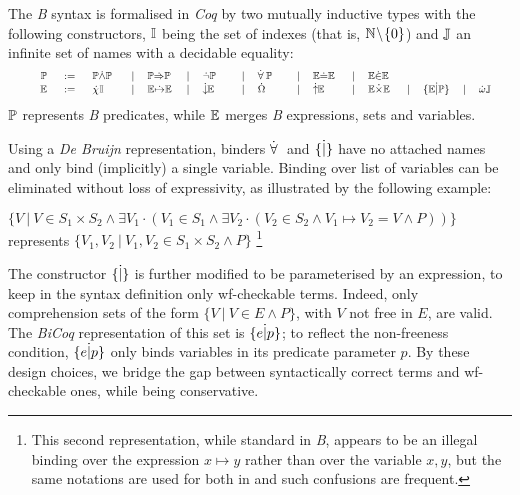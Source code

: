 \documentclass{llncs}
\begin{document}
The \emph{B} syntax is formalised in \emph{Coq} by two mutually inductive types with the 
following constructors, $\mathbb{I}$ being the set of indexes (that is, 
$\mathbb{N}\!\setminus\!\{\text{0}\}$) and $\mathbb{J}$ an infinite set of names with a decidable 
equality:
\[
\small
\begin{array}{rclclclclclclclcl}
\rule{1.0cm}{0cm} &
\rule{0.7cm}{0cm} & \rule{0.8cm}{0cm} &
\rule{0.2cm}{0cm} & \rule{0.8cm}{0cm} &
\rule{0.2cm}{0cm} & \rule{0.8cm}{0cm} &
\rule{0.2cm}{0cm} & \rule{0.8cm}{0cm} &
\rule{0.2cm}{0cm} & \rule{0.8cm}{0cm} &
\rule{0.2cm}{0cm} & \rule{0.8cm}{0cm} &
\rule{0.2cm}{0cm} & \rule{0.8cm}{0cm} &
\rule{0.2cm}{0cm} & \rule{0.8cm}{0cm} \vspace{-12pt} \\
\Bprd &:=& \Bprd \pand \Bprd &|& \Bprd \pimp \Bprd &|& \pnot \Bprd &|& \pfor \Bprd
        &|& \Bexp \pequ \Bexp &|& \Bexp \pins \Bexp
\\
\Bexp &:=& \evar{}\Bidx &|& \Bexp \ecpl \Bexp &|& \echs \Bexp  &|& \ebig &|& \epow \Bexp
       &|& \Bexp \epro \Bexp &|& \ecmp{\Bexp}{\Bprd} &|& \ebie{}\Bnamo
\end{array}
\]
$\mathbb{P}$ represents \emph{B} predicates, while $\mathbb{E}$ merges \emph{B} expressions, sets and 
variables.

Using a \emph{De Bruijn} representation, binders $\dot{\forall}\:$ and $\{ {}\dot{|}{} \} $ have no attached 
names and only bind (implicitly) a single variable. Binding over list of variables can be 
eliminated without loss of expressivity, as illustrated by the following example:

\begin{example}\label{ss_syntax_e2}\small
$\{V \:|\: V\!\in\!S_1\!\times\!S_2\!\land
              \exists V_1 \cdot (V_1\!\in\!S_1\!\land
               \exists V_2 \cdot (V_2\!\in\!S_2\!\land\!V_1\!\mapsto\!V_2\!=\!V\!\land\!P))\}$
represents
$\{V_1,V_2\:|\:V_1,V_2\!\in\!S_1\!\times\!S_2\!\land\!P\}$
\footnote{This second representation, while standard in \emph{B}, appears to be an illegal 
binding over the expression $x\!\mapsto\!y$ rather than over the variable $x,y$, but the same 
notations are used for both in \cite{abr:1} and such confusions are frequent.}
\end{example}
The constructor $\{ {}\dot{|}{} \} $ is further modified to be parameterised by an expression, to keep 
in the syntax definition only wf-checkable terms. Indeed, only comprehension sets of the form
$\{V\:|\:V\!\!\in\!E\land P\}$, with $V$ not free in $E$, are valid. The \emph{BiCoq} 
representation of this set is $\{ {e}\dot{|}{p} \} $; to reflect the non-freeness condition,
$\{ {e}\dot{|}{p} \} $ only binds variables in its predicate parameter $p$. By these design choices, we 
bridge the gap between syntactically correct terms and wf-checkable ones, while being 
conservative.
\end{document}
